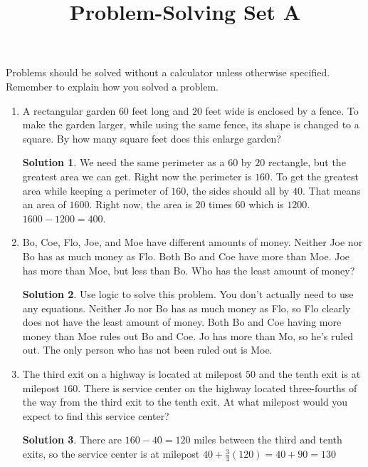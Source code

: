 \documentclass{article}
\title{Problem-Solving Set A}
\author{}
\date{}
\theoremstyle{definition}
\newtheorem*{solution}{Solution}
\begin{document}
\maketitle
\noindent Problems should be solved without a calculator unless otherwise specified.
Remember to explain how you solved a problem.
\begin{multicols}{2}
    \begin{enumerate}
        \item A rectangular garden $60$ feet long and $20$ feet wide is enclosed by a fence.
            To make the garden larger, while using the same fence, its shape is changed to a square.
            By how many square feet does this enlarge garden?
            \begin{solution}
                We need the same perimeter as a $60$ by $20$ rectangle, but the greatest area we can get.
                Right now the perimeter is $160$.
                To get the greatest area while keeping a perimeter of $160$, the sides should all by $40$.
                That means an area of $1600$.
                Right now, the area is $20$ times $60$ which is $1200$.
                $1600 - 1200 = 400$.
            \end{solution}
        \item Bo, Coe, Flo, Joe, and Moe have different amounts of money.
            Neither Joe nor Bo has as much money as Flo.
            Both Bo and Coe have more than Moe.
            Joe has more than Moe, but less than Bo.
            Who has the least amount of money?
            \begin{solution}
                Use logic to solve this problem.
                You don't actually need to use any equations.
                Neither Jo nor Bo has as much money as Flo, so Flo clearly does not have the least amount of money.
                Both Bo and Coe having more money than Moe rules out Bo and Coe.
                Jo has more than Mo, so he's ruled out.
                The only person who has not been ruled out is Moe.
            \end{solution}
        \item The third exit on a highway is located at milepost $50$ and the tenth exit is at milepost $160$.
            There is service center on the highway located three-fourths of the way from the third exit to the tenth exit.
            At what milepost would you expect to find this service center?
            \begin{solution}
                There are $160 - 40 = 120$ miles between the third and tenth exits, so the service center is at milepost $40 + \frac{3}{4} (120) = 40 + 90 = 130$

\end{solution}
\end{enumerate}
\end{multicols}
\end{document}
